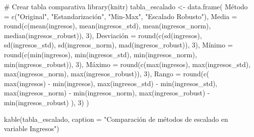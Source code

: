 \documentclass[
  letterpaper,
  DIV=11,
  numbers=noendperiod]{scrreprt}
\newenvironment{Shaded}{\begin{snugshade}}{\end{snugshade}}
\newcommand{\AttributeTok}[1]{\textcolor[rgb]{0.40,0.45,0.13}{#1}}
\newcommand{\CommentTok}[1]{\textcolor[rgb]{0.37,0.37,0.37}{#1}}
\newcommand{\DecValTok}[1]{\textcolor[rgb]{0.68,0.00,0.00}{#1}}
\newcommand{\FunctionTok}[1]{\textcolor[rgb]{0.28,0.35,0.67}{#1}}
\newcommand{\NormalTok}[1]{\textcolor[rgb]{0.00,0.23,0.31}{#1}}
\newcommand{\OtherTok}[1]{\textcolor[rgb]{0.00,0.23,0.31}{#1}}
\newcommand{\SpecialCharTok}[1]{\textcolor[rgb]{0.37,0.37,0.37}{#1}}
\newcommand{\StringTok}[1]{\textcolor[rgb]{0.13,0.47,0.30}{#1}}
\begin{document}
\begin{tcolorbox}
\begin{Shaded}
\begin{Highlighting}[]
\CommentTok{\# Crear tabla comparativa}
\FunctionTok{library}\NormalTok{(knitr)}
\NormalTok{tabla\_escalado }\OtherTok{\textless{}{-}} \FunctionTok{data.frame}\NormalTok{(}
\NormalTok{  Método }\OtherTok{=} \FunctionTok{c}\NormalTok{(}\StringTok{"Original"}\NormalTok{, }\StringTok{"Estandarización"}\NormalTok{, }\StringTok{"Min{-}Max"}\NormalTok{, }\StringTok{"Escalado Robusto"}\NormalTok{),}
  \AttributeTok{Media =} \FunctionTok{round}\NormalTok{(}\FunctionTok{c}\NormalTok{(}\FunctionTok{mean}\NormalTok{(ingresos), }\FunctionTok{mean}\NormalTok{(ingresos\_std), }\FunctionTok{mean}\NormalTok{(ingresos\_norm), }\FunctionTok{median}\NormalTok{(ingresos\_robust)), }\DecValTok{3}\NormalTok{),}
\NormalTok{  Desviación }\OtherTok{=} \FunctionTok{round}\NormalTok{(}\FunctionTok{c}\NormalTok{(}\FunctionTok{sd}\NormalTok{(ingresos), }\FunctionTok{sd}\NormalTok{(ingresos\_std), }\FunctionTok{sd}\NormalTok{(ingresos\_norm), }\FunctionTok{mad}\NormalTok{(ingresos\_robust)), }\DecValTok{3}\NormalTok{),}
\NormalTok{  Mínimo }\OtherTok{=} \FunctionTok{round}\NormalTok{(}\FunctionTok{c}\NormalTok{(}\FunctionTok{min}\NormalTok{(ingresos), }\FunctionTok{min}\NormalTok{(ingresos\_std), }\FunctionTok{min}\NormalTok{(ingresos\_norm), }\FunctionTok{min}\NormalTok{(ingresos\_robust)), }\DecValTok{3}\NormalTok{),}
\NormalTok{  Máximo }\OtherTok{=} \FunctionTok{round}\NormalTok{(}\FunctionTok{c}\NormalTok{(}\FunctionTok{max}\NormalTok{(ingresos), }\FunctionTok{max}\NormalTok{(ingresos\_std), }\FunctionTok{max}\NormalTok{(ingresos\_norm), }\FunctionTok{max}\NormalTok{(ingresos\_robust)), }\DecValTok{3}\NormalTok{),}
  \AttributeTok{Rango =} \FunctionTok{round}\NormalTok{(}\FunctionTok{c}\NormalTok{(}
    \FunctionTok{max}\NormalTok{(ingresos) }\SpecialCharTok{{-}} \FunctionTok{min}\NormalTok{(ingresos),}
    \FunctionTok{max}\NormalTok{(ingresos\_std) }\SpecialCharTok{{-}} \FunctionTok{min}\NormalTok{(ingresos\_std),}
    \FunctionTok{max}\NormalTok{(ingresos\_norm) }\SpecialCharTok{{-}} \FunctionTok{min}\NormalTok{(ingresos\_norm),}
    \FunctionTok{max}\NormalTok{(ingresos\_robust) }\SpecialCharTok{{-}} \FunctionTok{min}\NormalTok{(ingresos\_robust)}
\NormalTok{  ), }\DecValTok{3}\NormalTok{)}
\NormalTok{)}

\FunctionTok{kable}\NormalTok{(tabla\_escalado, }\AttributeTok{caption =} \StringTok{"Comparación de métodos de escalado en variable Ingresos"}\NormalTok{)}
\end{Highlighting}
\end{Shaded}


\end{tcolorbox}
\end{document}
